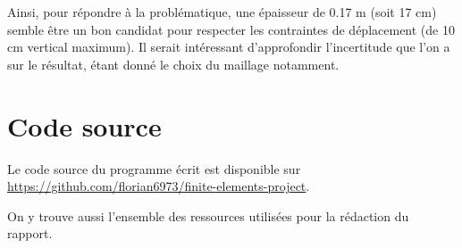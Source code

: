 \documentclass{article}
\begin{document}
    Ainsi, pour répondre à la problématique, une épaisseur de 0.17 m (soit 17 cm) semble être un bon candidat pour respecter les contraintes de déplacement (de 10 cm vertical maximum).
    Il serait intéressant d'approfondir l'incertitude que l'on a sur le résultat, étant donné le choix du maillage notamment.        
    
    \clearpage
    \appendix
    \section {Code source}
    \label{source_code}

    Le code source du programme écrit est disponible sur \url{https://github.com/florian6973/finite-elements-project}.

    On y trouve aussi l'ensemble des ressources utilisées pour la rédaction du rapport.

    
\end{document}
